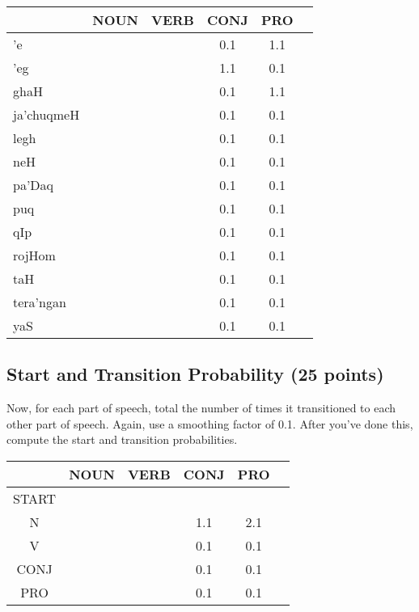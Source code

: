 \documentclass[11pt,twoside]{article}
\begin{document}
\begin{center}
\begin{tabular}{|l|c|c|c|c|c|}
\hline
   & NOUN & VERB & CONJ & PRO \\
\hline
'e &   &   &  0.1    &  1.1   \\
\hline
'eg &     &     &  1.1    &  0.1 \\
\hline
ghaH &     &    &  0.1    &  1.1  \\
\hline
ja'chuqmeH &     &     &  0.1    &  0.1   \\
\hline
legh &     &     &  0.1    &  0.1 \\
\hline
neH &     &     &  0.1    &  0.1   \\
\hline
pa'Daq &     &     &  0.1    &  0.1 \\
\hline
puq &     &     &  0.1    &  0.1 \\
\hline
qIp &     &     &  0.1    &  0.1 \\
\hline
rojHom &     &     &  0.1    &  0.1\\
\hline
taH &     &     &  0.1    &  0.1 \\
\hline
tera'ngan &     &     &  0.1    &  0.1 \\
\hline
yaS &     &     &  0.1    &  0.1   \\
\hline
\end{tabular}
\end{center}

\subsection{Start and Transition Probability (25 points)}

Now, for each part of speech, total the number of times it
transitioned to each other part of speech.  Again, use a smoothing
factor of 0.1.  After you've done this, compute the start and transition probabilities.

\begin{center}
\begin{tabular}{|c|c|c|c|c|c|}
\hline
      & NOUN & VERB & CONJ & PRO \\
\hline
START &  &   &  &   \\
\hline
N     &   &   & 1.1  & 2.1  \\
\hline
V     &   &   & 0.1  & 0.1  \\
\hline
CONJ  &   &   &  0.1 & 0.1 \\
\hline
PRO   &  &   &  0.1 & 0.1 \\
\hline
\end{tabular}
\end{center}
\end{document}
